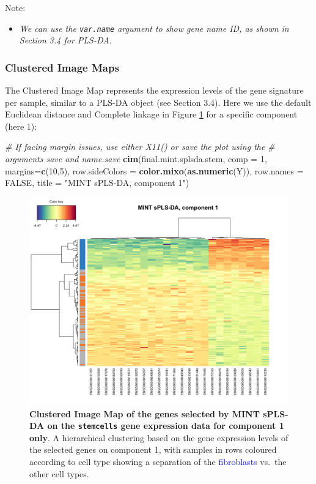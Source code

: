 \documentclass[]{book}
\newenvironment{Shaded}{\begin{snugshade}}{\end{snugshade}}
\newcommand{\CommentTok}[1]{\textcolor[rgb]{0.56,0.35,0.01}{\textit{#1}}}
\newcommand{\DataTypeTok}[1]{\textcolor[rgb]{0.13,0.29,0.53}{#1}}
\newcommand{\DecValTok}[1]{\textcolor[rgb]{0.00,0.00,0.81}{#1}}
\newcommand{\KeywordTok}[1]{\textcolor[rgb]{0.13,0.29,0.53}{\textbf{#1}}}
\newcommand{\NormalTok}[1]{#1}
\newcommand{\OtherTok}[1]{\textcolor[rgb]{0.56,0.35,0.01}{#1}}
\newcommand{\StringTok}[1]{\textcolor[rgb]{0.31,0.60,0.02}{#1}}
\providecommand{\tightlist}{%
  \setlength{\itemsep}{0pt}\setlength{\parskip}{0pt}}
\begin{document}
Note:

\begin{itemize}
\tightlist
\item
  \emph{We can use the \texttt{var.name} argument to show gene name ID, as shown in Section 3.4 for PLS-DA.}
\end{itemize}

\hypertarget{clustered-image-maps}{%
\subsubsection{Clustered Image Maps}\label{clustered-image-maps}}

The Clustered Image Map represents the expression levels of the gene signature per sample, similar to a PLS-DA object (see Section 3.4). Here we use the default Euclidean distance and Complete linkage in Figure \ref{fig:MINT-cim} for a specific component (here 1):

\begin{Shaded}
\begin{Highlighting}[]
\CommentTok{# If facing margin issues, use either X11() or save the plot using the}
\CommentTok{# arguments save and name.save}
\KeywordTok{cim}\NormalTok{(final.mint.splsda.stem, }\DataTypeTok{comp =} \DecValTok{1}\NormalTok{, }\DataTypeTok{margins=}\KeywordTok{c}\NormalTok{(}\DecValTok{10}\NormalTok{,}\DecValTok{5}\NormalTok{), }
    \DataTypeTok{row.sideColors =} \KeywordTok{color.mixo}\NormalTok{(}\KeywordTok{as.numeric}\NormalTok{(Y)), }\DataTypeTok{row.names =} \OtherTok{FALSE}\NormalTok{,}
    \DataTypeTok{title =} \StringTok{"MINT sPLS-DA, component 1"}\NormalTok{)}
\end{Highlighting}
\end{Shaded}

\begin{figure}

{\centering \includegraphics[width=0.5\linewidth]{Figures/MINT/MINT-cim-1} 

}

\caption{\textbf{Clustered Image Map of the genes selected by MINT sPLS-DA on the \texttt{stemcells} gene expression data for component 1 only}. A hierarchical clustering based on the gene expression levels of the selected genes on component 1, with samples in rows coloured according to cell type showing a separation of the \textcolor{blue}{fibroblasts} vs.~the other cell types.}\label{fig:MINT-cim}
\end{figure}
\end{document}
